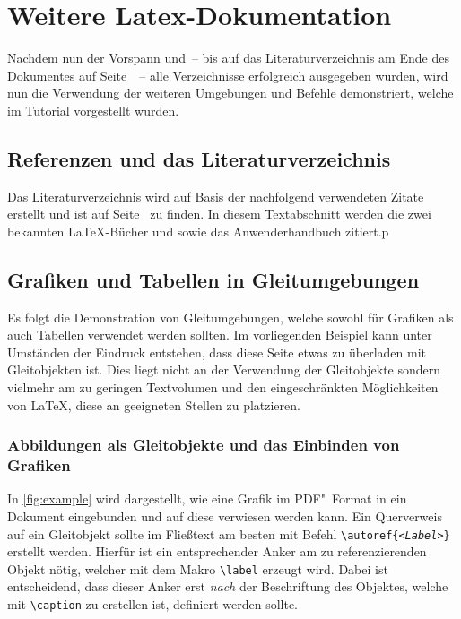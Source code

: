 \chapter{Weitere Latex-Dokumentation}
Nachdem nun der Vorspann und~-- bis auf das Literaturverzeichnis am
Ende des Dokumentes auf Seite~\pageref{sec:bibliography}~-- alle
Verzeichnisse erfolgreich ausgegeben wurden, wird nun die Verwendung
der weiteren Umgebungen und Befehle demonstriert, welche im Tutorial
 vorgestellt wurden.

\section{Referenzen und das Literaturverzeichnis}
Das Literaturverzeichnis wird auf Basis der nachfolgend verwendeten
Zitate erstellt und ist auf Seite~\pageref{sec:bibliography} zu finden.
In diesem Textabschnitt werden die zwei bekannten \LaTeX-Bücher
\cite{knuth84} und \cite{goossens94} sowie das Anwenderhandbuch
\cite{hanisch14} zitiert.p

\section{Grafiken und Tabellen in Gleitumgebungen}
Es folgt die Demonstration von Gleitumgebungen, welche sowohl für
Grafiken als auch Tabellen verwendet werden sollten. Im vorliegenden
Beispiel kann unter Umständen der Eindruck entstehen, dass diese Seite
etwas zu überladen mit Gleitobjekten ist. Dies liegt nicht an der
Verwendung der Gleitobjekte sondern vielmehr am zu geringen Textvolumen
und den eingeschränkten Möglichkeiten von \LaTeX{}, diese an geeigneten
Stellen zu platzieren.

\subsection{Abbildungen als Gleitobjekte und das Einbinden von Grafiken}
In \autoref{fig:example} wird dargestellt, wie eine Grafik im PDF"~Format
in ein Dokument eingebunden und auf diese verwiesen werden kann. Ein
Querverweis auf ein Gleitobjekt sollte im Fließtext am besten mit Befehl
\texttt{\textbackslash autoref\{\emph{<Label>}\}} erstellt werden.
Hierfür ist ein entsprechender Anker am zu referenzierenden Objekt nötig,
welcher mit dem Makro \texttt{\textbackslash label} erzeugt wird. Dabei
ist entscheidend, dass dieser Anker erst \emph{nach} der Beschriftung des
Objektes, welche mit \texttt{\textbackslash caption} zu erstellen ist,
definiert werden sollte.

